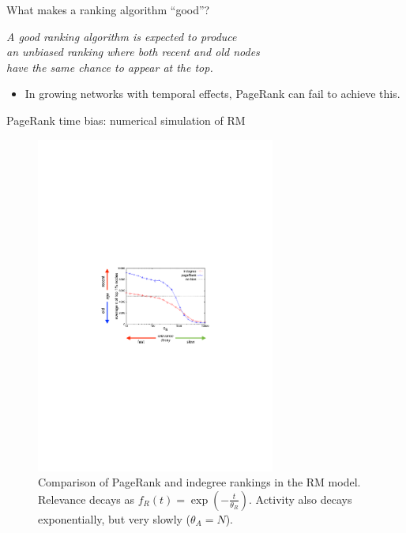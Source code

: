 \documentclass[utf8]{beamer}
\begin{document}
\begin{frame}{What makes a ranking algorithm ``good''?}
    \begin{center}
        \emph{A good ranking algorithm is expected to produce \\ an unbiased ranking where both \alert{recent} and \alert{old} nodes \\ have \alert{the same chance to appear at the top}.}
    \end{center}
    \begin{itemize}
        \item In growing networks with temporal effects, \alert{PageRank can fail} to achieve this.
    \end{itemize}
\end{frame}

\begin{frame}{PageRank time bias: numerical simulation of RM}
    \begin{figure}
        \includegraphics[width=0.7\textwidth]{figures/PageRank_time_bias}
        \caption{Comparison of PageRank and indegree rankings in the RM model. \newline
        Relevance decays as $f_R(t) = \exp(-\frac{t}{\theta_R})$. \newline
        Activity also decays exponentially, but very slowly ($\theta_A=N$).}
    \end{figure}
\end{frame}
\end{document}
